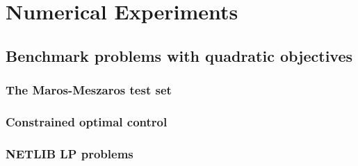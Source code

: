 \documentclass[11pt,a4paper]{article}
\begin{document}
\section{Numerical Experiments}

\subsection{Benchmark problems with quadratic objectives}

    \subsubsection{The Maros-Meszaros test set}


    \pagebreak
    \subsubsection{Constrained optimal control}



    \subsubsection{NETLIB LP problems}


\end{document}
